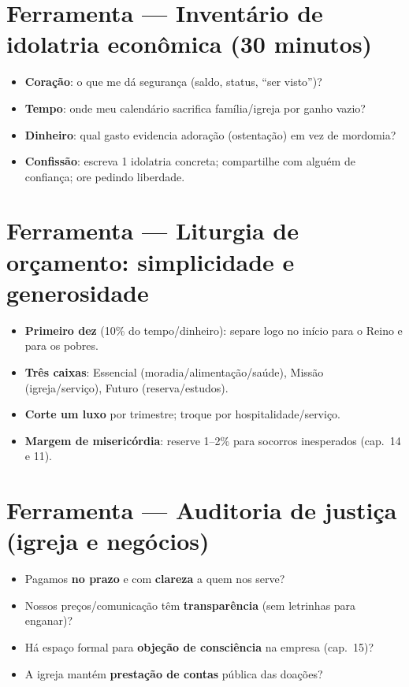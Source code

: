 \section{Ferramenta — Inventário de idolatria econômica (30 minutos)}
\begin{checklist}
\begin{itemize}[leftmargin=*,noitemsep]
  \item \textbf{Coração}: o que me dá segurança (saldo, status, “ser visto”)?
  \item \textbf{Tempo}: onde meu calendário sacrifica família/igreja por ganho vazio?
  \item \textbf{Dinheiro}: %
  qual gasto evidencia adoração (ostentação) em vez de mordomia?
  \item \textbf{Confissão}: escreva 1 idolatria concreta; compartilhe com alguém de confiança; ore pedindo liberdade.
\end{itemize}
\end{checklist}

\section{Ferramenta — Liturgia de orçamento: simplicidade e generosidade}
\begin{checklist}[title={Passos práticos (família/solo)}]
\begin{itemize}[leftmargin=*,noitemsep]
  \item \textbf{Primeiro dez} (10\% do tempo/dinheiro): separe logo no início para o Reino e para os pobres.
  \item \textbf{Três caixas}: Essencial (moradia/alimentação/saúde), Missão (igreja/serviço), Futuro (reserva/estudos).
  \item \textbf{Corte um luxo} por trimestre; troque por hospitalidade/serviço.
  \item \textbf{Margem de misericórdia}: reserve 1--2\% para socorros inesperados (cap.~14 e 11).
\end{itemize}
\end{checklist}

\section{Ferramenta — Auditoria de justiça (igreja e negócios)}
\begin{checklist}[title={Perguntas que doem (e curam)}]
\begin{itemize}[leftmargin=*,noitemsep]
  \item Pagamos \textbf{no prazo} e com \textbf{clareza} a quem nos serve?
  \item Nossos preços/comunicação têm \textbf{transparência} (sem letrinhas para enganar)?
  \item Há espaço formal para \textbf{objeção de consciência} na empresa (cap.~15)?
  \item A igreja mantém \textbf{prestação de contas} pública das doações?
\end{itemize}
\end{checklist}

